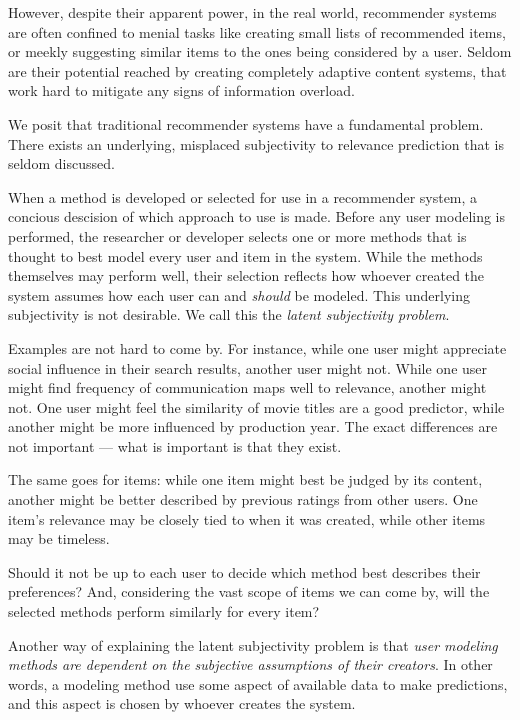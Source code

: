 However, despite their apparent power, in the real world, recommender systems are often confined
to menial tasks like creating small lists of recommended items, 
or meekly suggesting similar items to the ones being considered by a user.
Seldom are their potential reached by creating completely adaptive
content systems, that work hard to mitigate any signs of information overload.

We posit that traditional recommender systems have a fundamental problem.
There exists an underlying, misplaced subjectivity to relevance prediction that is seldom discussed.

When a method is developed or selected for use in a recommender system,
a concious descision of which approach to use is made.
Before any user modeling is performed, the researcher or developer selects
one or more methods that is thought to best model every user and item in the system.
While the methods themselves may perform well, their selection
reflects how whoever created the system assumes how each user
can and \emph{should} be modeled. This underlying subjectivity is not desirable.
We call this the \emph{latent subjectivity problem}.

Examples are not hard to come by.
For instance, while one user might appreciate social
influence in their search results, another user might not.
While one user might find frequency of communication maps well to relevance,
another might not. 
One user might feel the similarity of movie titles are a good predictor,
while another might be more influenced by production year.
The exact differences are not important --- what is important is that they exist.

The same goes for items: while one item might best be judged by its content,
another might be better described by previous ratings from other users.
One item's relevance may be closely tied to when it was created,
while other items may be timeless.

Should it not be up to each user to decide which method best describes their preferences?
And, considering the vast scope of items we can come by, will the selected
methods perform similarly for every item?

Another way of explaining the latent subjectivity problem is that 
\emph{user modeling methods are dependent on the subjective assumptions of their creators}.
In other words, a modeling method use some aspect of available data to make predictions,
and this aspect is chosen by whoever creates the system.

